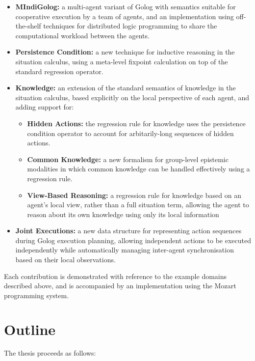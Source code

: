 \begin{itemize}
\item \textbf{MIndiGolog:} a multi-agent variant of Golog with semantics
suitable for cooperative execution by a team of agents, and an implementation
using off-the-shelf techniques for distributed logic programming to
share the computational workload between the agents.
\item \textbf{Persistence Condition:} a new technique for inductive reasoning
in the situation calculus, using a meta-level fixpoint calculation
on top of the standard regression operator.
\item \textbf{Knowledge:} an extension of the standard semantics of knowledge
in the situation calculus, based explicitly on the local perspective
of each agent, and adding support for:

\begin{itemize}
\item \textbf{Hidden Actions:} the regression rule for knowledge uses the
persistence condition operator to account for arbitarily-long sequences
of hidden actions.
\item \textbf{Common Knowledge:} a new formalism for group-level epistemic
modalities in which common knowledge can be handled effectively using
a regression rule. 
\item \textbf{View-Based Reasoning:} a regression rule for knowledge based
on an agent's local view, rather than a full situation term, allowing
the agent to reason about its own knowledge using only its local information
\end{itemize}
\item \textbf{Joint Executions:} a new data structure for representing action
sequences during Golog execution planning, allowing independent actions
to be executed independently while automatically managing inter-agent
synchronisation based on their local observations.
\end{itemize}
Each contribution is demonstrated with reference to the example domains
described above, and is accompanied by an implementation using the
Mozart programming system.


\section{Outline}

The thesis proceeds as follows:

